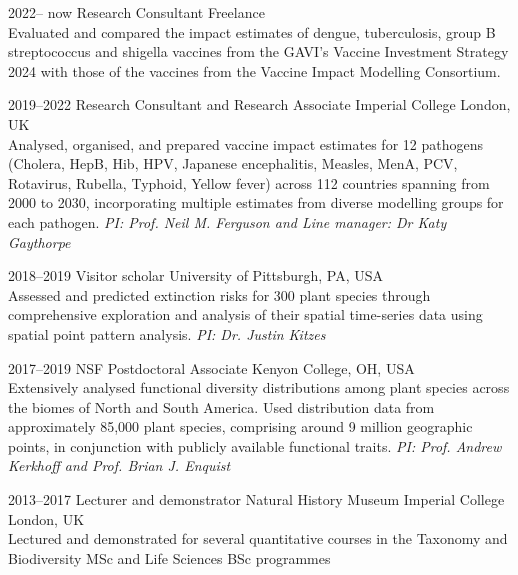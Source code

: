 \documentclass[icon]{twentysecondcv}
\begin{document}
\begin{twenty} %


 \twentyitem
    	{2022-- now}
    	{Research Consultant}
	{Freelance}
        	{\\ \small  Evaluated and compared the impact estimates of dengue, tuberculosis, group B streptococcus and shigella vaccines from the GAVI’s Vaccine Investment Strategy 2024 with those of the vaccines from the Vaccine Impact Modelling Consortium.}
        	
	
 \twentyitem
       {2019--2022}
       {Research Consultant and Research Associate}
       {Imperial College London, UK}
       { \\ \small Analysed, organised, and prepared vaccine impact estimates for 12 pathogens (Cholera, HepB, Hib, HPV, Japanese encephalitis, Measles, MenA, PCV, Rotavirus, Rubella, Typhoid, Yellow fever) across 112 countries spanning from 2000 to 2030, incorporating multiple estimates from diverse modelling groups for each pathogen. \textit{ PI: Prof. Neil M. Ferguson and Line manager: Dr Katy Gaythorpe}}
      
\twentyitem
    	{2018--2019}
	{Visitor scholar}
        	{University of Pittsburgh, PA, USA}
        	{\\ \small Assessed and predicted extinction risks for 300 plant species through comprehensive exploration and analysis of their spatial time-series data using spatial point pattern analysis. \textit{PI: Dr. Justin Kitzes}}

	\twentyitem
    	{2017--2019}
	{NSF Postdoctoral Associate}
        {Kenyon College, OH, USA}
        {\\  \small Extensively analysed functional diversity distributions among plant species across the biomes of North and South America. Used distribution data from approximately 85,000 plant species, comprising around 9 million geographic points, in conjunction with publicly available functional traits. \textit{PI: Prof. Andrew Kerkhoff and Prof. Brian J. Enquist} }
      
    
    \twentyitem
	{2013--2017}
	{Lecturer and demonstrator}
	{Natural History Museum  Imperial College London, UK}
	{\\ \small Lectured and demonstrated for several quantitative courses in the Taxonomy and Biodiversity MSc and Life Sciences BSc programmes}
\end{twenty}
\end{document}
